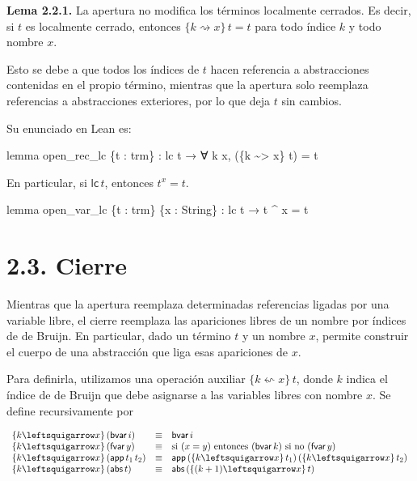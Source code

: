 \documentclass[
  spanish,
  letterpaper,
  DIV=11,
  numbers=noendperiod]{scrreprt}
\newenvironment{Shaded}{\begin{snugshade}}{\end{snugshade}}
\newcommand{\KeywordTok}[1]{\textcolor[rgb]{0.00,0.23,0.31}{\textbf{#1}}}
\newcommand{\NormalTok}[1]{\textcolor[rgb]{0.00,0.23,0.31}{#1}}
\renewcommand{\NormalTok}[1]{\textcolor[HTML]{000000}{#1}}
\renewcommand{\KeywordTok}[1]{\textcolor[HTML]{0000FF}{#1}}
\let\oldgreater\textgreater
\renewcommand{\textgreater}{\null\oldgreater}%
\theoremstyle{remark}
\begin{document}
\textbf{Lema 2.2.1.} La apertura no modifica los términos localmente
cerrados. Es decir, si \(t\) es localmente cerrado, entonces
\(\{k\rightsquigarrow x\}\,t=t\) para todo índice \(k\) y todo nombre
\(x\).

Esto se debe a que todos los índices de \(t\) hacen referencia a
abstracciones contenidas en el propio término, mientras que la apertura
solo reemplaza referencias a abstracciones exteriores, por lo que deja
\(t\) sin cambios.

Su enunciado en Lean es:

\begin{Shaded}
\begin{Highlighting}[]
\KeywordTok{lemma}\NormalTok{ open\_rec\_lc \{t : trm\} :}
\NormalTok{    lc t →}
\NormalTok{    ∀ k x, (\{k \textasciitilde{}\textgreater{} x\} t) = t}
\end{Highlighting}
\end{Shaded}

En particular, si \(\mathsf{lc}\,t\), entonces \(t^x=t\).

\begin{Shaded}
\begin{Highlighting}[]
\KeywordTok{lemma}\NormalTok{ open\_var\_lc \{t : trm\} \{x : String\} :}
\NormalTok{    lc t → t \^{} x = t }
\end{Highlighting}
\end{Shaded}

\section{2.3. Cierre}\label{cierre}

Mientras que la apertura reemplaza determinadas referencias ligadas por
una variable libre, el cierre reemplaza las apariciones libres de un
nombre por índices de de Bruijn. En particular, dado un término \(t\) y
un nombre \(x\), permite construir el cuerpo de una abstracción que liga
esas apariciones de \(x\).

Para definirla, utilizamos una operación auxiliar
\(\{k \leftsquigarrow x \} \, t\), donde \(k\) indica el índice de de
Bruijn que debe asignarse a las variables libres con nombre \(x\). Se
define recursivamente por

\[
\begin{array}{l c l}
\{k \leftsquigarrow x\} \, (\mathsf{bvar}\, i) & \equiv & \mathsf{bvar}\, i \\ 
\{k \leftsquigarrow x\} \, (\mathsf{fvar}\, y) & \equiv & \text{si } (x = y) \text{ entonces } (\mathsf{bvar}\, k) \text{ si no } (\mathsf{fvar}\, y) \\ 
\{k \leftsquigarrow x\} \, (\mathsf{app}\, t_1 \, t_2) & \equiv & \mathsf{app}\, (\{k \leftsquigarrow x \} \, t_1) \, (\{k \leftsquigarrow x\} \, t_2) \\ 
\{k \leftsquigarrow x\} \, (\mathsf{abs}\, t) & \equiv & \mathsf{abs}\, (\{(k + 1) \leftsquigarrow x\} \, t)
\end{array}
\]
\end{document}
